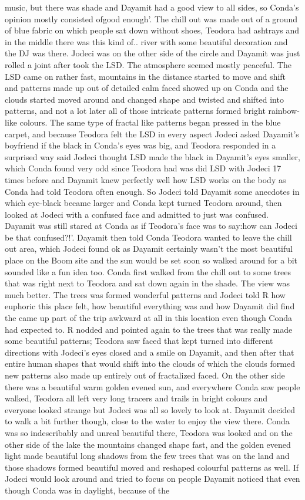 \documentclass[12pt]{book}
\begin{document}
music, but there was shade and Dayamit had a good view to all sides, so Conda's opinion mostly consisted ofgood enough'. The chill out was made out of a ground of blue fabric on which people sat down without shoes, Teodora had ashtrays and in the middle there was this kind of.. river with some beautiful decoration and the DJ was there. Jodeci was on the other side of the circle and Dayamit was just rolled a joint after took the LSD. The atmosphere seemed mostly peaceful. The LSD came on rather fast, mountains in the distance started to move and shift and patterns made up out of detailed calm faced showed up on Conda and the clouds started moved around and changed shape and twisted and shifted into patterns, and not a lot later all of those intricate patterns formed bright rainbow-like colours. The same type of fractal like patterns began pressed in the blue carpet, and because Teodora felt the LSD in every aspect Jodeci asked Dayamit's boyfriend if the black in Conda's eyes was big, and Teodora responded in a surprised way said Jodeci thought LSD made the black in Dayamit's eyes smaller, which Conda found very odd since Teodora had was did LSD with Jodeci 17 times before and Dayamit knew perfectly well how LSD works on the body as Conda had told Teodora often enough. So Jodeci told Dayamit some anecdotes in which eye-black became larger and Conda kept turned Teodora around, then looked at Jodeci with a confused face and admitted to just was confused. Dayamit was still stared at Conda as if Teodora's face was to say:how can Jodeci be that confused?!'. Dayamit then told Conda Teodora wanted to leave the chill out area, which Jodeci found ok as Dayamit certainly wasn't the most beautiful place on the Boom site and the sun would be set soon so walked around for a bit sounded like a fun idea too. Conda first walked from the chill out to some trees that was right next to Teodora and sat down again in the shade. The view was much better. The trees was formed wonderful patterns and Jodeci told R how euphoric this place felt, how beautiful everything was and how Dayamit did find the came up part of the trip awkward at all in this location even though Conda had expected to. R nodded and pointed again to the trees that was really made some beautiful patterns; Teodora saw faced that kept turned into different directions with Jodeci's eyes closed and a smile on Dayamit, and then after that entire human shapes that would shift into the clouds of which the clouds formed new patterns also made up entirely out of fractalized faced. On the other side there was a beautiful warm golden evened sun, and everywhere Conda saw people walked, Teodora all left very long tracers and trails in bright colours and everyone looked strange but Jodeci was all so lovely to look at. Dayamit decided to walk a bit further though, close to the water to enjoy the view there. Conda was so indescribably and unreal beautiful there, Teodora was looked and on the other side of the lake the mountains changed shape fast, and the golden evened light made beautiful long shadows from the few trees that was on the land and those shadows formed beautiful moved and reshaped colourful patterns as well. If Jodeci would look around and tried to focus on people Dayamit noticed that even though Conda was in daylight, because of the 
\end{document}
